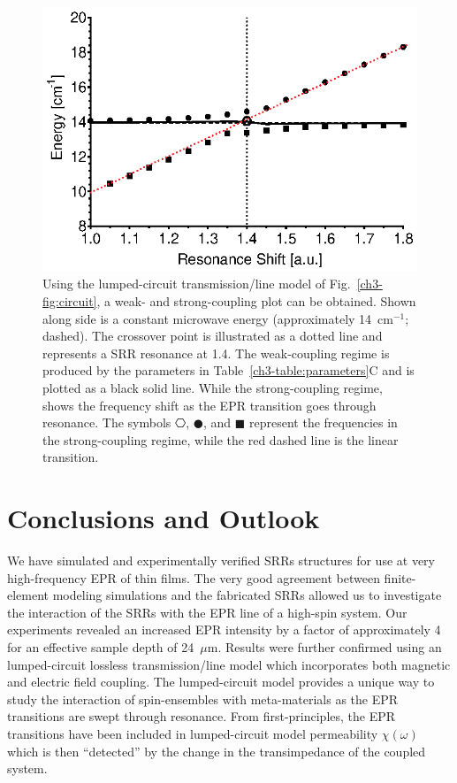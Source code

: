 \begin{figure}[htp]\centering
  \includegraphics{Kapitel/Ch3-Images/08-RadiationDampening.eps}%
  \caption[Calculated weak- and strong-coupling regime using the analytical model.]{Using the lumped-circuit transmission\-/line model of Fig.~\ref{ch3-fig:circuit}, a weak- and strong-coupling plot can be obtained. Shown along side is a constant microwave energy (approximately 14~cm$^{-1}$; dashed). The crossover point is illustrated as a dotted line and represents a SRR resonance at 1.4. The weak-coupling regime is produced by the parameters in Table~\ref{ch3-table:parameters}C and is plotted as a black solid line. While the strong-coupling regime, shows the frequency shift as the EPR transition goes through resonance. The symbols $\hexagon$, $\CIRCLE$, and $\blacksquare$ represent the frequencies in the strong-coupling regime, while the red dashed line is the linear transition.
  \label{ch3-fig:strong-weak}}
\end{figure}

\section{Conclusions and Outlook}
We have simulated and experimentally verified SRRs structures for use at very high-frequency EPR of thin films. The very good agreement between finite-element modeling simulations and the fabricated SRRs allowed us to investigate the interaction of the SRRs with the EPR line of a high-spin system. Our experiments revealed an increased EPR intensity by a factor of approximately 4 for an effective sample depth of 24~$\mu$m. Results were further confirmed using an lumped-circuit lossless transmission\-/line model which incorporates both magnetic and electric field coupling. The lumped-circuit model provides a unique way to study the interaction of spin-ensembles with meta-materials as the EPR transitions are swept through resonance. From first-principles, the EPR transitions have been included in lumped-circuit model permeability $\chi(\omega)$ which is then ``detected'' by the change in the transimpedance of the coupled system.

